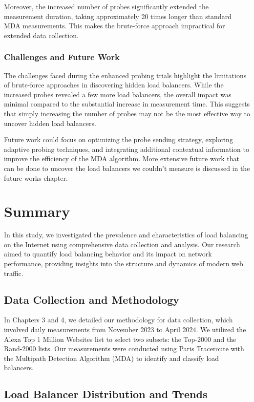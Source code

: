 \documentclass[12pt]{cwru_thesis}
\begin{document}
Moreover, the increased number of probes significantly extended the measurement duration, taking approximately 20 times longer than standard MDA measurements. This makes the brute-force approach impractical for extended data collection.

\subsection{Challenges and Future Work}

The challenges faced during the enhanced probing trials highlight the limitations of brute-force approaches in discovering hidden load balancers. While the increased probes revealed a few more load balancers, the overall impact was minimal compared to the substantial increase in measurement time. This suggests that simply increasing the number of probes may not be the most effective way to uncover hidden load balancers.

Future work could focus on optimizing the probe sending strategy, exploring adaptive probing techniques, and integrating additional contextual information to improve the efficiency of the MDA algorithm. More extensive future work that can be done to uncover the load balancers we couldn't measure is discussed in the future works chapter.


\chapter{Summary}
In this study, we investigated the prevalence and characteristics of load balancing on the Internet using comprehensive data collection and analysis. Our research aimed to quantify load balancing behavior and its impact on network performance, providing insights into the structure and dynamics of modern web traffic.

\section*{Data Collection and Methodology}

In Chapters 3 and 4, we detailed our methodology for data collection, which involved daily measurements from November 2023 to April 2024. We utilized the Alexa Top 1 Million Websites list to select two subsets: the Top-2000 and the Rand-2000 lists. Our measurements were conducted using Paris Traceroute with the Multipath Detection Algorithm (MDA) to identify and classify load balancers.

\section*{Load Balancer Distribution and Trends}
\end{document}
